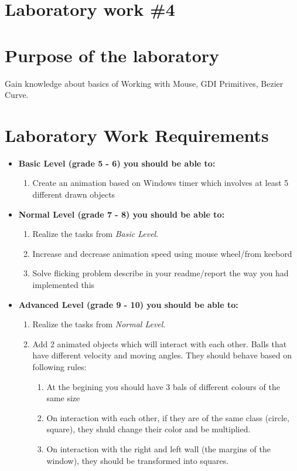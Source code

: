 \section*{Laboratory work \#4}

\section{Purpose of the laboratory}
Gain knowledge about basics of Working with Mouse, GDI Primitives, Bezier Curve.
\section{Laboratory Work Requirements}
\begin{itemize}
\item \textbf{Basic Level (grade 5 - 6) you should be able to:}
	\begin{enumerate}
	\item Create an animation based on Windows timer which involves at least 5 different drawn objects
      \end{enumerate}
\item \textbf{Normal Level (grade 7 - 8) you should be able to:}
      \begin{enumerate}
    \item Realize the tasks from \textit{Basic Level}.
    \item Increase and decrease animation speed using mouse wheel/from keebord
    \item Solve flicking problem describe in your readme/report the way you had implemented this
    \end{enumerate}
\item \textbf{Advanced Level (grade 9 - 10) you should be able to:}
      \begin{enumerate}
    \item Realize the tasks from \textit{Normal Level}.
    \item Add 2 animated objects which will interact with each other. Balls that have different velocity and moving angles. They should behave based on following rules:
      \begin{enumerate}
      \item At the begining you should have 3 bals of different colours of the same size
      \item On interaction with each other, if they are of the same class (circle, square), they shuld change their color and be multiplied.
      \item On interaction with the right and left wall (the margins of the window), they should be transformed into squares.

\end{enumerate}
\end{enumerate}
\end{itemize}

